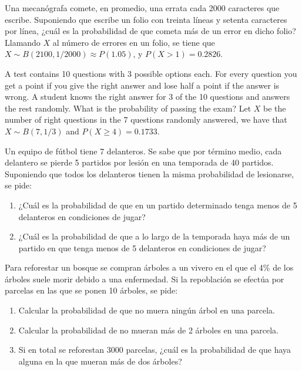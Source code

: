 {Una mecanógrafa comete, en promedio, una errata cada 2000 caracteres que escribe.
Suponiendo que escribe un folio con treinta líneas y setenta caracteres por línea, ¿cuál es la probabilidad de que
cometa más de un error en dicho folio?}
{Llamando $X$ al número de errores en un folio, se tiene que $X\sim B(2100,1/2000)\approx P(1.05)$, y $P(X>1)=0.2826$.
}
{}


{A test contains 10 questions with 3 possible options each. 
For every question you get a point if you give the right answer and lose half a point if the answer is wrong. 
A student knows the right answer for 3 of the 10 questions and answers the rest randomly. 
What is the probability of passing the exam?}
{Let $X$ be the number of right questions in the 7 questions randomly answered, we have that $X\sim B(7,1/3)$ and $P(X\geq 4)=0.1733$.}
{}


{Un equipo de fútbol tiene 7 delanteros. Se sabe que por término medio, cada delantero se pierde 5 partidos por lesión en una temporada de 40 partidos. Suponiendo que todos los delanteros tienen la misma probabilidad de lesionarse, se pide:
\begin{enumerate}
\item  ¿Cuál es la probabilidad de que en un partido determinado tenga menos de 5 delanteros en condiciones de jugar?
\item  ¿Cuál es la probabilidad de que a lo largo de la temporada haya más de un partido en que tenga menos de 5  delanteros en condiciones de jugar?
\end{enumerate}
}
{}
{}


{Para reforestar un bosque se compran árboles a un vivero en el que el 4\% de los árboles suele morir debido a una enfermedad. Si la repoblación se efectúa por parcelas en las que se ponen 10 árboles, se pide:
\begin{enumerate}
\item Calcular la probabilidad de que no muera ningún árbol en una parcela.
\item Calcular la probabilidad de no mueran más de 2 árboles en una parcela.
\item Si en total se reforestan 3000 parcelas, ¿cuál es la probabilidad de que haya alguna en la que mueran más de dos árboles?
\end{enumerate}
}
{}
{}


